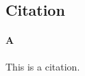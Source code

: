 \documentclass{article}
\begin{document}
\subsection{Citation}

\paragraph{A}

This is a citation\cite{Eg}.

\newpage





\end{document}
